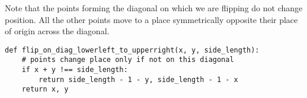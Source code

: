 \documentclass[12pt]{scrartcl}
\begin{document}
Note that the points forming the diagonal on which we are flipping do not change position. All the other points move to a place symmetrically opposite their place of origin across the diagonal. 

\begin{lstlisting}
def flip_on_diag_lowerleft_to_upperright(x, y, side_length):
    # points change place only if not on this diagonal
    if x + y !== side_length:
        return side_length - 1 - y, side_length - 1 - x
    return x, y
\end{lstlisting}
\end{document}
